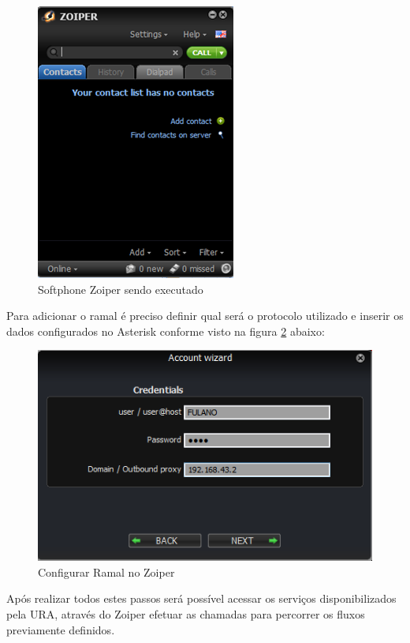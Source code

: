 \begin{figure}[!htb]
	\centering
	\caption{Softphone Zoiper sendo executado}	
	\label{figura:zoiper}
	\includegraphics{figuras/zoiper.png}
\end{figure}


Para adicionar o ramal é preciso definir qual será o protocolo utilizado e inserir os dados configurados no Asterisk conforme visto na figura \ref{figura:zoiperConfigRamal} abaixo:

\begin{figure}[!htb]
	\centering
	\caption{Configurar Ramal no Zoiper}
	\label{figura:zoiperConfigRamal}
	\includegraphics{figuras/configurar_ramal_zoiper.png}
\end{figure}

Após realizar todos estes passos será possível acessar os serviços disponibilizados pela URA, através do Zoiper efetuar as chamadas para percorrer os fluxos previamente definidos.